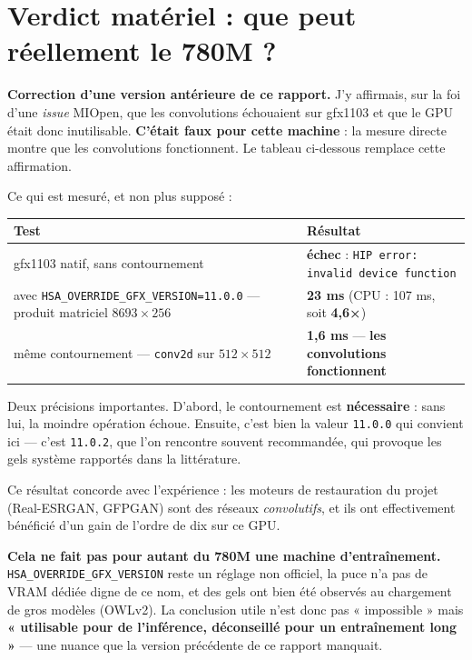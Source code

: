 \documentclass[11pt,a4paper]{article}
\newcommand{\aretenir}[1]{%
  \par\medskip
  \noindent\colorbox{encadre}{%
    \begin{minipage}{\dimexpr\linewidth-2\fboxsep}
      \vspace{2pt}#1\vspace{2pt}
    \end{minipage}}%
  \par\medskip
}
\newcommand{\alerte}[1]{\textcolor{alerte}{\textbf{#1}}}
\newcommand{\bon}[1]{\textcolor{vert}{\textbf{#1}}}
\begin{document}
\section{Verdict matériel : que peut réellement le 780M ?}

\aretenir{\alerte{Correction d'une version antérieure de ce rapport.}
J'y affirmais, sur la foi d'une \emph{issue} MIOpen, que les convolutions
échouaient sur gfx1103 et que le GPU était donc inutilisable. \textbf{C'était
faux pour cette machine} : la mesure directe montre que les convolutions
fonctionnent. Le tableau ci-dessous remplace cette affirmation.}

Ce qui est mesuré, et non plus supposé :

\begin{table}[h]
\centering\small
\begin{tabularx}{\textwidth}{YY}
\toprule
\textbf{Test} & \textbf{Résultat} \\
\midrule
gfx1103 natif, sans contournement
  & \alerte{échec} : \texttt{HIP error: invalid device function} \\
\addlinespace
avec \texttt{HSA\_OVERRIDE\_GFX\_VERSION=11.0.0} --- produit matriciel
$8693\times256$
  & \bon{23 ms} (CPU : 107 ms, soit \textbf{4,6×}) \\
\addlinespace
même contournement --- \texttt{conv2d} sur $512\times512$
  & \bon{1,6 ms} --- \textbf{les convolutions fonctionnent} \\
\bottomrule
\end{tabularx}
\end{table}

Deux précisions importantes. D'abord, le contournement est \textbf{nécessaire} :
sans lui, la moindre opération échoue. Ensuite, c'est bien la valeur
\texttt{11.0.0} qui convient ici --- c'est \texttt{11.0.2}, que l'on rencontre
souvent recommandée, qui provoque les gels système rapportés dans la
littérature.

Ce résultat concorde avec l'expérience : les moteurs de restauration du projet
(Real-ESRGAN, GFPGAN) sont des réseaux \emph{convolutifs}, et ils ont
effectivement bénéficié d'un gain de l'ordre de dix sur ce GPU.

\alerte{Cela ne fait pas pour autant du 780M une machine d'entraînement.}
\texttt{HSA\_\allowbreak OVERRIDE\_\allowbreak GFX\_\allowbreak VERSION} reste un réglage non officiel, la puce n'a
pas de VRAM dédiée digne de ce nom, et des gels ont bien été observés au
chargement de gros modèles (OWLv2). La conclusion utile n'est donc pas
« impossible » mais \textbf{« utilisable pour de l'inférence, déconseillé pour
un entraînement long »} --- une nuance que la version précédente de ce rapport
manquait.
\end{document}
